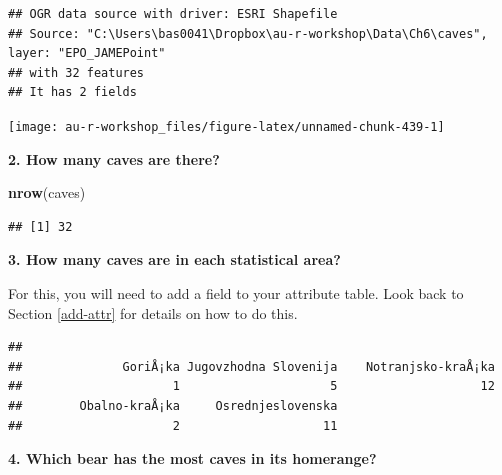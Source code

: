 \documentclass[]{book}
\newenvironment{Shaded}{\begin{snugshade}}{\end{snugshade}}
\newcommand{\KeywordTok}[1]{\textcolor[rgb]{0.13,0.29,0.53}{\textbf{#1}}}
\newcommand{\DecValTok}[1]{\textcolor[rgb]{0.00,0.00,0.81}{#1}}
\newcommand{\StringTok}[1]{\textcolor[rgb]{0.31,0.60,0.02}{#1}}
\newcommand{\OperatorTok}[1]{\textcolor[rgb]{0.81,0.36,0.00}{\textbf{#1}}}
\newcommand{\NormalTok}[1]{#1}
\theoremstyle{definition}
\theoremstyle{definition}
\theoremstyle{definition}
\theoremstyle{remark}
\begin{document}
\begin{verbatim}
## OGR data source with driver: ESRI Shapefile 
## Source: "C:\Users\bas0041\Dropbox\au-r-workshop\Data\Ch6\caves", layer: "EPO_JAMEPoint"
## with 32 features
## It has 2 fields
\end{verbatim}

\begin{center}\texttt{[image: au-r-workshop\_files/figure-latex/unnamed-chunk-439-1]} \end{center}

\textbf{2. How many caves are there?}

\begin{Shaded}
\begin{Highlighting}[]
\KeywordTok{nrow}\NormalTok{(caves)}
\end{Highlighting}
\end{Shaded}

\begin{verbatim}
## [1] 32
\end{verbatim}

\textbf{3. How many caves are in each statistical area?}

For this, you will need to add a field to your attribute table. Look
back to Section \ref{add-attr} for details on how to do this.

\begin{Shaded}
\end{Shaded}

\begin{verbatim}
## 
##              GoriÅ¡ka Jugovzhodna Slovenija    Notranjsko-kraÅ¡ka 
##                     1                     5                    12 
##        Obalno-kraÅ¡ka     Osrednjeslovenska 
##                     2                    11
\end{verbatim}

\textbf{4. Which bear has the most caves in its homerange?}
\end{document}
